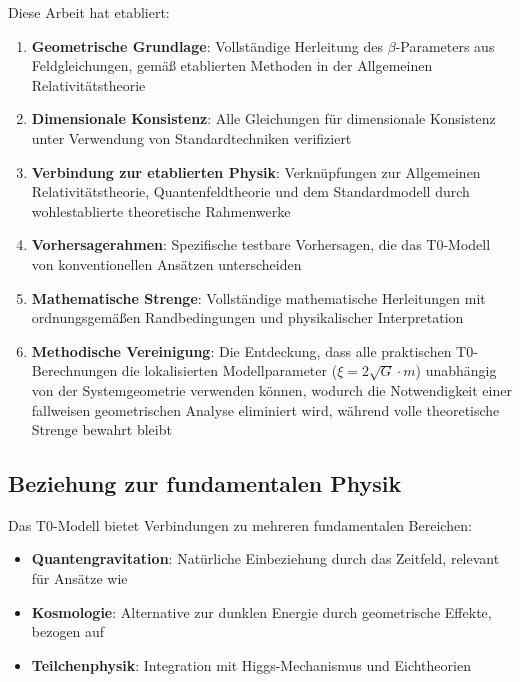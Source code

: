 \documentclass[12pt,a4paper]{article}
\begin{document}
	Diese Arbeit hat etabliert:
	\begin{enumerate}
		\item \textbf{Geometrische Grundlage}: Vollständige Herleitung des $\beta$-Parameters aus Feldgleichungen, gemäß etablierten Methoden in der Allgemeinen Relativitätstheorie \citep{misner1973,carroll2004}
		
		\item \textbf{Dimensionale Konsistenz}: Alle Gleichungen für dimensionale Konsistenz unter Verwendung von Standardtechniken verifiziert \citep{barenblatt1996}
		
		\item \textbf{Verbindung zur etablierten Physik}: Verknüpfungen zur Allgemeinen Relativitätstheorie, Quantenfeldtheorie und dem Standardmodell durch wohlestablierte theoretische Rahmenwerke
		
		\item \textbf{Vorhersagerahmen}: Spezifische testbare Vorhersagen, die das T0-Modell von konventionellen Ansätzen unterscheiden
		
		\item \textbf{Mathematische Strenge}: Vollständige mathematische Herleitungen mit ordnungsgemäßen Randbedingungen und physikalischer Interpretation
		
		\item \textbf{Methodische Vereinigung}: Die Entdeckung, dass alle praktischen T0-Berechnungen die lokalisierten Modellparameter ($\xi = 2\sqrt{G} \cdot m$) unabhängig von der Systemgeometrie verwenden können, wodurch die Notwendigkeit einer fallweisen geometrischen Analyse eliminiert wird, während volle theoretische Strenge bewahrt bleibt
	\end{enumerate}
	
	\subsection{Beziehung zur fundamentalen Physik}
	\label{subsec:fundamental_physics}
	
	Das T0-Modell bietet Verbindungen zu mehreren fundamentalen Bereichen:
	\begin{itemize}
		\item \textbf{Quantengravitation}: Natürliche Einbeziehung durch das Zeitfeld, relevant für Ansätze wie \citep{thiemann2007,rovelli2004}
		\item \textbf{Kosmologie}: Alternative zur dunklen Energie durch geometrische Effekte, bezogen auf \citep{weinberg2008,peebles1993}
		\item \textbf{Teilchenphysik}: Integration mit Higgs-Mechanismus und Eichtheorien \citep{weinberg2003,peskin1995}
	\end{itemize}
	
\end{document}

